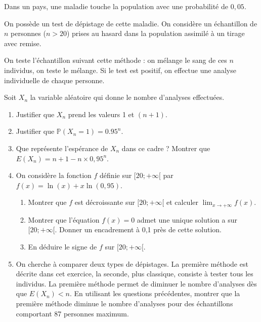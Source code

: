 \documentclass[11pt,fleqn, openany]{book} %
\begin{document}
 
 

\begin{exercise}[subtitle={(Centres étrangers 2021)}]Dans un pays, une maladie touche la population avec une probabilité de $0,05$.

On possède un test de dépistage de cette maladie. On considère un échantillon de $n$ personnes ($n>20$) prises au hasard dans la population assimilé à un tirage avec remise.

On teste l'échantillon suivant cette méthode : on mélange le sang de ces $n$ individus, on teste le mélange. Si le test est positif, on effectue une analyse individuelle de chaque personne.

Soit $X_n$ la variable aléatoire qui donne le nombre d'analyses effectuées.
\begin{enumerate}
\item Justifier que $X_n$ prend les valeurs 1 et $(n +1)$.
\item Justifier que $\mathbb{P}(X_n=1)=0.95^n$.
\item Que représente l'espérance de $X_n$ dans ce cadre ? Montrer que $E(X_n)=n+1-n \times 0,95^n$.

\item On considère la fonction $f$ définie sur $[20 ; +\infty[$ par $f (x) = \ln(x)+ x \ln(0,95)$.
\begin{enumerate}
\item Montrer que $f$ est décroissante sur $[20 ; +\infty[$ et calculer $\displaystyle\lim_{x \to + \infty}f(x)$.
\item Montrer que l'équation  $f (x) = 0$ admet une unique solution a sur $[20 ; +\infty[$.
Donner un encadrement à 0,1 près de cette solution.
\item En déduire le signe de $f$ sur $[20 ; +\infty[$. \end{enumerate}
\item On cherche à comparer deux types de dépistages.
La première méthode est décrite dans cet exercice, la seconde, plus classique, consiste à tester tous les individus.
La première méthode permet de diminuer le nombre d'analyses dès que $E (X_n) < n$.
En utilisant les questions précédentes, montrer que la première méthode diminue le nombre d'analyses pour des échantillons comportant 87 personnes maximum.\end{enumerate}\end{exercise}
\end{document}
